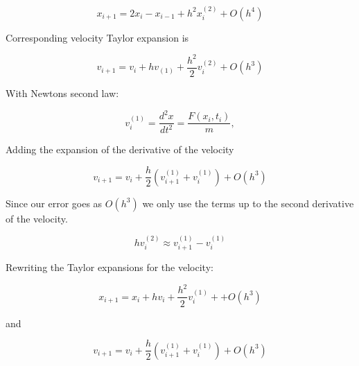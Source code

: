 \documentclass[../main.tex]{subfiles}
\begin{document}
\begin{equation}
  x_{i+1} = 2x_i - x_{i-1} + h^2 x_i^{(2)} + O(h^4)
\end{equation}

Corresponding velocity Taylor expansion is

\begin{equation}
  v_{i+1} = v_i + hv_{(1)} + \frac{h^2}{2} v_i^{(2)} + O(h^3)
\end{equation}

With Newtons second law:

\begin{equation}
  v_i^{(1)} = \frac{d^2x}{dt^2} = \frac{F(x_i, t_i)}{m},
\end{equation}

Adding the expansion of the derivative of the velocity

\begin{equation}
  v_{i+1} = v_i + \frac{h}{2}\left(v_{i+1}^{(1)} + v_i^{(1)}\right) + O(h^3)
\end{equation}

Since our error goes as $O(h^3)$ we only use the terms up to the second derivative of the velocity.

\begin{equation}
  hv_i^{(2)}\approx v_{i+1}^{(1)} - v_i^{(1)}

\end{equation}

Rewriting the Taylor expansions for the velocity:

\begin{equation}
  x_{i+1} = x_i + hv_i + \frac{h^2}{2} v_i^{(1)} + + O(h^3)
\end{equation}

and

\begin{equation}
  v_{i+1} = v_i + \frac{h}{2} \left(v_{i+1}^{(1)} + v_i^{(1)}\right) + O(h^3)
\end{equation}
\end{document}
